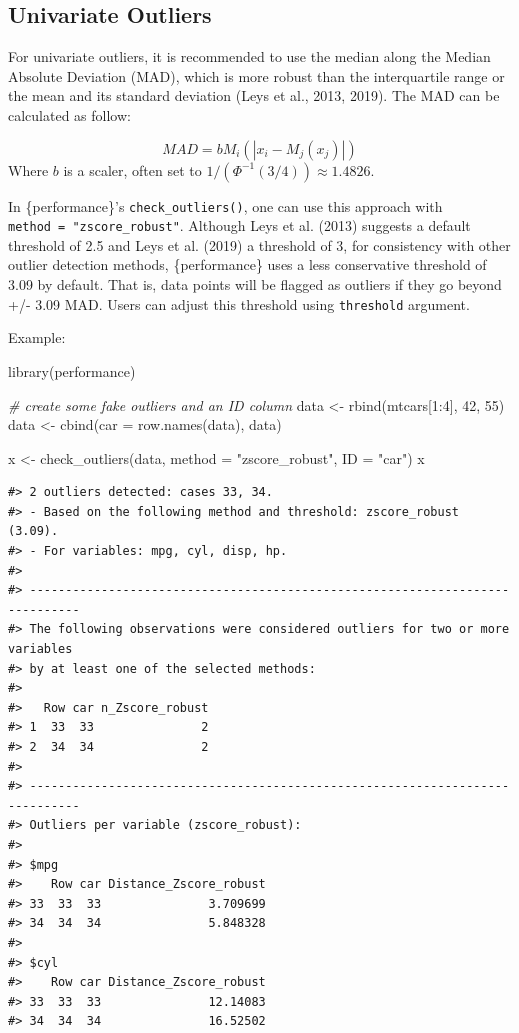 \documentclass[
]{article}
\newenvironment{Shaded}{\begin{snugshade}}{\end{snugshade}}
\newcommand{\AttributeTok}[1]{\textcolor[rgb]{0.77,0.63,0.00}{#1}}
\newcommand{\CommentTok}[1]{\textcolor[rgb]{0.56,0.35,0.01}{\textit{#1}}}
\newcommand{\DecValTok}[1]{\textcolor[rgb]{0.00,0.00,0.81}{#1}}
\newcommand{\FunctionTok}[1]{\textcolor[rgb]{0.00,0.00,0.00}{#1}}
\newcommand{\NormalTok}[1]{#1}
\newcommand{\OtherTok}[1]{\textcolor[rgb]{0.56,0.35,0.01}{#1}}
\newcommand{\SpecialCharTok}[1]{\textcolor[rgb]{0.00,0.00,0.00}{#1}}
\newcommand{\StringTok}[1]{\textcolor[rgb]{0.31,0.60,0.02}{#1}}
\begin{document}
\hypertarget{univariate-outliers}{%
\subsection{Univariate Outliers}\label{univariate-outliers}}

For univariate outliers, it is recommended to use the median along the
Median Absolute Deviation (MAD), which is more robust than the
interquartile range or the mean and its standard deviation (Leys et al.,
2013, 2019). The MAD can be calculated as follow:

\[
MAD = b M_i(|x_i-M_j(x_j)|)
\] Where \(b\) is a scaler, often set to
\(1/\left(\Phi ^{-1}(3/4)\right)\approx 1.4826\).

In \{performance\}'s \texttt{check\_outliers()}, one can use this
approach with \texttt{method\ =\ "zscore\_robust"}. Although Leys et al.
(2013) suggests a default threshold of 2.5 and Leys et al. (2019) a
threshold of 3, for consistency with other outlier detection methods,
\{performance\} uses a less conservative threshold of 3.09 by default.
That is, data points will be flagged as outliers if they go beyond +/-
3.09 MAD. Users can adjust this threshold using \texttt{threshold}
argument.

Example:

\begin{Shaded}
\begin{Highlighting}[]
\FunctionTok{library}\NormalTok{(performance)}

\CommentTok{\# create some fake outliers and an ID column}
\NormalTok{data }\OtherTok{\textless{}{-}} \FunctionTok{rbind}\NormalTok{(mtcars[}\DecValTok{1}\SpecialCharTok{:}\DecValTok{4}\NormalTok{], }\DecValTok{42}\NormalTok{, }\DecValTok{55}\NormalTok{)}
\NormalTok{data }\OtherTok{\textless{}{-}} \FunctionTok{cbind}\NormalTok{(}\AttributeTok{car =} \FunctionTok{row.names}\NormalTok{(data), data)}

\NormalTok{x }\OtherTok{\textless{}{-}} \FunctionTok{check\_outliers}\NormalTok{(data, }\AttributeTok{method =} \StringTok{"zscore\_robust"}\NormalTok{, }\AttributeTok{ID =} \StringTok{"car"}\NormalTok{)}
\NormalTok{x}
\end{Highlighting}
\end{Shaded}

\begin{verbatim}
#> 2 outliers detected: cases 33, 34.
#> - Based on the following method and threshold: zscore_robust (3.09).
#> - For variables: mpg, cyl, disp, hp.
#> 
#> -----------------------------------------------------------------------------
#> The following observations were considered outliers for two or more variables 
#> by at least one of the selected methods: 
#> 
#>   Row car n_Zscore_robust
#> 1  33  33               2
#> 2  34  34               2
#> 
#> -----------------------------------------------------------------------------
#> Outliers per variable (zscore_robust): 
#> 
#> $mpg
#>    Row car Distance_Zscore_robust
#> 33  33  33               3.709699
#> 34  34  34               5.848328
#> 
#> $cyl
#>    Row car Distance_Zscore_robust
#> 33  33  33               12.14083
#> 34  34  34               16.52502
\end{verbatim}
\end{document}
